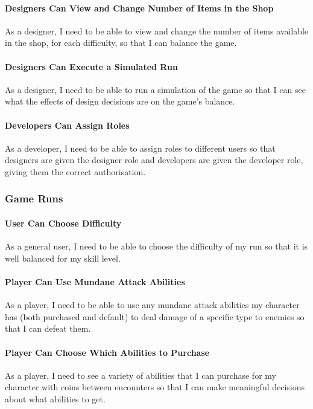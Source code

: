 \paragraph{Designers Can View and Change Number of Items in the Shop}
As a designer, I need to be able to view and change the number of items available in the shop, for each difficulty, so that I can balance the game.

\paragraph{Designers Can Execute a Simulated Run}
As a designer, I need to be able to run a simulation of the game so that I can see what the effects of design decisions are on the game's balance.

\paragraph{Developers Can Assign Roles}
As a developer, I need to be able to assign roles to different users so that designers are given the designer role and developers are given the developer role, giving them the correct authorisation.

\subsubsection{Game Runs}

\paragraph{User Can Choose Difficulty}
As a general user, I need to be able to choose the difficulty of my run so that it is well balanced for my skill level.

\paragraph{Player Can Use Mundane Attack Abilities}
As a player, I need to be able to use any mundane attack abilities my character has (both purchased and default) to deal damage of a specific type to enemies so that I can defeat them.

\paragraph{Player Can Choose Which Abilities to Purchase}
As a player, I need to see a variety of abilities that I can purchase for my character with coins between encounters so that I can make meaningful decisions about what abilities to get.

